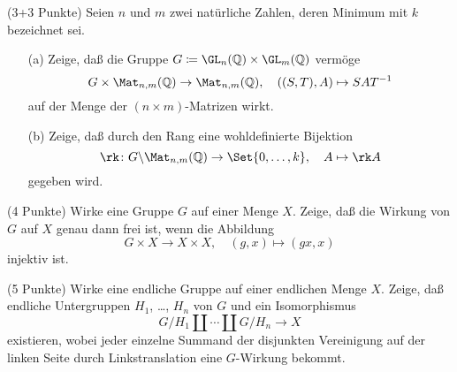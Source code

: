 \documentclass{algsheet}
\author{Dipl.-Math.~Franz Vogler}
\date{09.~Mai 2011}
\begin{document}
                \maketitle


\begin{exercise}(3+3 Punkte)\newline
    Seien \(n\) und \(m\) zwei natürliche Zahlen, deren Minimum mit \(k\)
    bezeichnet sei. 
\begin{itemize}
  \item [(a)] Zeige, daß die Gruppe
    \(G \coloneqq \GL_n(\mathbb Q) \times \GL_m(\mathbb Q)\) vermöge
    \begin{equation}
        G \times \Mat_{n, m}(\mathbb Q) \to \Mat_{n, m}(\mathbb Q),\quad
        ((S, T), A) \mapsto S A T^{-1}
    \end{equation}
    auf der Menge der \((n \times m)\)-Matrizen wirkt.
 \item [(b)] Zeige, daß durch den Rang
    eine wohldefinierte Bijektion
    \begin{equation}
        \rk\colon G \backslash \Mat_{n, m}(\mathbb Q) \to \Set{0, \dotsc, k},
        \quad A \mapsto \rk A
    \end{equation}
    gegeben wird.
\end{itemize}
\end{exercise}






\begin{exercise}(4 Punkte)\newline
    Wirke eine Gruppe \(G\) auf einer Menge \(X\). Zeige, daß die Wirkung von
    \(G\) auf \(X\) genau dann frei ist, wenn die Abbildung
    \begin{equation}    
        G \times X \to X \times X,\quad
        (g, x) \mapsto (gx, x)
    \end{equation}
    injektiv ist.
\end{exercise}




\begin{exercise}(5 Punkte)\newline
    Wirke eine endliche Gruppe auf einer endlichen Menge \(X\). Zeige, daß
    endliche Untergruppen \(H_1\), \dots, \(H_n\) von \(G\) und ein Isomorphismus
    \begin{equation}
        G/H_1 \amalg \dotsb \amalg G/H_n \to X
    \end{equation}
    existieren, wobei jeder einzelne Summand der disjunkten Vereinigung auf der
    linken Seite durch Linkstranslation eine \(G\)-Wirkung bekommt.
\end{exercise}
\end{document}
